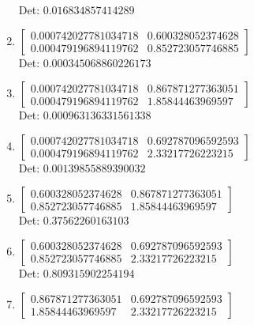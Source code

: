 \documentclass[12pt]{article}
\begin{document}
\begin{enumerate}
Det: $0.016834857414289$\\

\item $\displaystyle \left[\begin{matrix}0.000742027781034718 & 0.600328052374628\\0.000479196894119762 & 0.852723057746885\end{matrix}\right]$\\

Det: $0.000345068860226173$\\

\item $\displaystyle \left[\begin{matrix}0.000742027781034718 & 0.867871277363051\\0.000479196894119762 & 1.85844463969597\end{matrix}\right]$\\

Det: $0.000963136331561338$\\

\item $\displaystyle \left[\begin{matrix}0.000742027781034718 & 0.692787096592593\\0.000479196894119762 & 2.33217726223215\end{matrix}\right]$\\

Det: $0.00139855889390032$\\

\item $\displaystyle \left[\begin{matrix}0.600328052374628 & 0.867871277363051\\0.852723057746885 & 1.85844463969597\end{matrix}\right]$\\

Det: $0.37562260163103$\\

\item $\displaystyle \left[\begin{matrix}0.600328052374628 & 0.692787096592593\\0.852723057746885 & 2.33217726223215\end{matrix}\right]$\\

Det: $0.809315902254194$\\

\item $\displaystyle \left[\begin{matrix}0.867871277363051 & 0.692787096592593\\1.85844463969597 & 2.33217726223215\end{matrix}\right]$\\


\end{enumerate}
\end{document}
